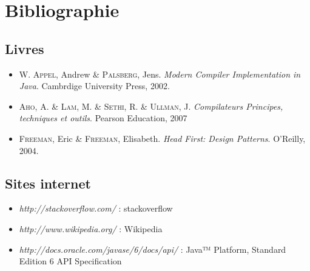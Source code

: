 \section*{Bibliographie} %

\subsection*{Livres}

\begin{itemize}
    \item \textsc{W. Appel}, Andrew \& \textsc{Palsberg}, Jens. \emph{Modern Compiler Implementation in Java}. Cambrdige University Press, 2002.
    \item \textsc{Aho}, A. \& \textsc{Lam}, M. \& \textsc{Sethi}, R. \& \textsc{Ullman}, J. \emph{Compilateurs Principes, techniques et outils}. Pearson Education, 2007
    \item \textsc{Freeman}, Eric \& \textsc{Freeman}, Elisabeth. \emph{Head First: Design Patterns}. O'Reilly, 2004.
\end{itemize}

\subsection*{Sites internet}

\begin{itemize}
    \item \emph{http://stackoverflow.com/} : stackoverflow
    \item \emph{http://www.wikipedia.org/} : Wikipedia
    \item \emph{http://docs.oracle.com/javase/6/docs/api/} : 
        Java™ Platform, Standard Edition 6
        API Specification
\end{itemize}
